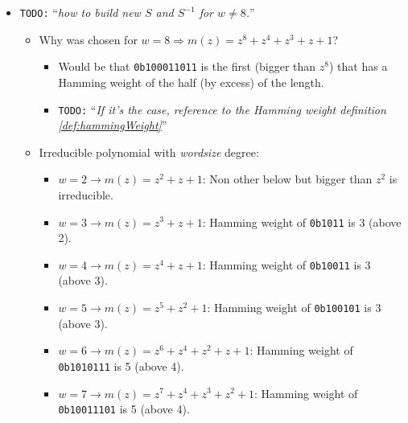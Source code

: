 \documentclass[10pt,a4paper,twoside]{llncs}
\newcommand{\todo}[1]{\texttt{\color{red}TODO:} ``\emph{#1}''}
\begin{document}
\begin{itemize}
 \item \todo{how to build new $S$ and $S^{-1}$ for $w\neq 8$.}
 \begin{itemize}
  \item Why was chosen for $w=8 \Rightarrow m(z) = z^8+z^4+z^3+z+1$?
  \begin{itemize}
   \item Would be that \texttt{0b100011011} is the first (bigger than $z^8$) that has a Hamming weight of the half (by excess) of the length.
   \item \todo{If it's the case, reference to the Hamming weight definition \ref{def:hammingWeight}}
  \end{itemize}
  \item Irreducible polynomial with \emph{wordsize} degree:
  \begin{itemize}
   \item $w=2 \rightarrow m(z) = z^2+z+1$: Non other below but bigger than $z^2$ is irreducible.
   \item $w=3 \rightarrow m(z) = z^3+z+1$: Hamming weight of \texttt{0b1011} is 3 (above 2).
   \item $w=4 \rightarrow m(z) = z^4+z+1$: Hamming weight of \texttt{0b10011} is 3 (above 3).
   \item $w=5 \rightarrow m(z) = z^5+z^2+1$: Hamming weight of \texttt{0b100101} is 3 (above 3).
   \item $w=6 \rightarrow m(z) = z^6+z^4+z^2+z+1$: Hamming weight of \texttt{0b1010111} is 5 (above 4).
   \item $w=7 \rightarrow m(z) = z^7+z^4+z^3+z^2+1$: Hamming weight of \texttt{0b10011101} is 5 (above 4).

\end{itemize}
\end{itemize}
\end{itemize}
\end{document}

